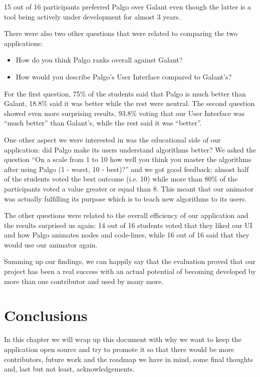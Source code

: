 \documentclass{l4proj}
\begin{document}
15 out of 16 participants preferred Palgo over Galant even though the latter is a tool being actively under development for almost 3 years.

There were also two other questions that were related to comparing the two applications:

\begin{itemize}
  \item How do you think Palgo ranks overall against Galant?
  \item How would you describe Palgo's User Interface compared to Galant's?
\end{itemize}

For the first question, 75\% of the students said that Palgo is much better than Galant, 18.8\% said it was better while the
rest were neutral. The second question showed even more surprising results, 93.8\% voting that our User Interface was
``much
better'' than Galant's, while the rest said it was ``better''.

One other aspect we were interested in was the educational side of our application: did Palgo make its users understand
algorithms better? We asked the question ``On a scale from 1 to 10 how well you think you master the algorithms after
using Palgo (1 - worst, 10 - best)?'' and we got good feedback: almost half of the students voted the best outcome
(i.e. 10) while more than 80\% of the participants voted a value greater or equal than 8. This meant that our animator
was actually fulfilling its purpose which is to teach new algorithms to its users.

The other questions were related to the overall efficiency of our application and the results surprised us again: 14 out
of 16 students voted that they liked our UI and how Palgo animates nodes and code-lines, while 16 out of 16 said that
they would use our animator again.

Summing up our findings, we can happily say that the evaluation proved that our project has been a real success with an
actual potential of becoming developed by more than one contributor and used by many more.


\chapter{Conclusions}
\label{conclusions}

In this chapter we will wrap up this document with why we want to keep the application open source and try to promote it
so that there would be more contributors, future work and the roadmap we have in mind, some final thoughts and, last but
not least, acknowledgements.
\end{document}
